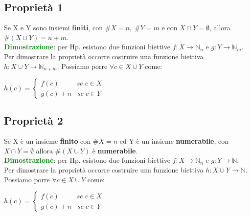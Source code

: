 \subsection{Proprietà 1}
Se X e Y sono insiemi \textbf{finiti}, con $\#X = n, \; \#Y = m$ e con $X \cap Y = \emptyset$, allora $\#(X \cup Y) = n + m$. \\
\textcolor{green}{\textbf{Dimostrazione}}: per Hp. esistono due funzioni biettive $f : X \rightarrow \mathbb{N}_n$ e $g : Y \rightarrow \mathbb{N}_m$. Per dimostrare la proprietà occorre costruire una funzione biettiva $h : X \cup Y \rightarrow \mathbb{N}_{n + m}$. Possiamo porre $\forall c \in X \cup Y$ come:
\begin{center}
    \begin{math}
        h(c) = 
        \begin{cases}
            f(c) \qquad \;\; se \; c \in X \\
            g(c) + n \; \;\; se \; c \in Y
        \end{cases}
    \end{math}
\end{center}

\subsection{Proprietà 2}
Se X è un insieme \textbf{finito} con $\#X = n$ ed Y è un insieme \textbf{numerabile}, con $X \cap Y = \emptyset$ allora $\#(X \cup Y)$ è \textbf{numerabile}. \\
\textcolor{green}{\textbf{Dimostrazione}}: per Hp. esistono due funzioni biettive $f : X \rightarrow \mathbb{N}_n$ e $g : Y \rightarrow \mathbb{N}$. Per dimostrare la proprietà occorre costruire una funzione biettiva $h : X \cup Y \rightarrow \mathbb{N}$. Possiamo porre $\forall c \in X \cup Y$ come:
\begin{center}
    \begin{math}
        h(c) = 
        \begin{cases}
            f(c) \qquad \;\; se \; c \in X \\
            g(c) + n \; \;\; se \; c \in Y
        \end{cases}
    \end{math}
\end{center}

\newpage
